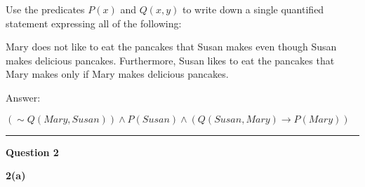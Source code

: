 \documentclass[a4paper,12pt,oneside]{book}
\theoremstyle{definition}
\begin{document}
Use the predicates $P(x)$ and $Q(x,y)$ to write down a single quantified statement expressing all of the following:

Mary does not like to eat the pancakes that Susan makes even though Susan makes delicious pancakes. Furthermore, Susan likes to eat the pancakes that Mary makes only if Mary makes delicious pancakes.

Answer:

$(\sim Q(Mary,Susan)) \wedge P(Susan) \wedge (Q(Susan,Mary) \longrightarrow P(Mary)) $

\hrule 

\bigskip

\noindent
{\bf Question 2}

\bigskip

\noindent
{\bf 2(a)}
\end{document}
